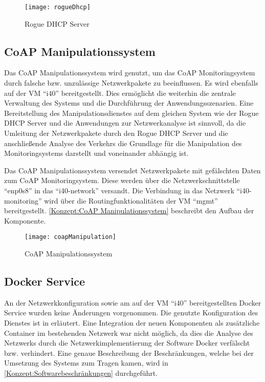 \begin{figure}[h]
  \centering
  \texttt{[image: rogueDhcp]}
  \caption{Rogue DHCP Server} 
  \label{Konzept:Rogue DHCP Server}
\end{figure}

\subsection{\ac{CoAP} Manipulationssystem}
Das \ac{CoAP} Manipulationssystem wird genutzt, um das \ac{CoAP} Monitoringsystem durch falsche bzw. unzulässige Netzwerkpakete zu beeinflussen. Es wird ebenfalls auf der \ac{VM} "`i40"' bereitgestellt. Dies ermöglicht die weiterhin die zentrale Verwaltung des Systems und die Durchführung der Anwendungsszenarien. Eine Bereitstellung des Manipulationsdienstes auf dem gleichen System wie der Rogue \ac{DHCP} Server und die Anwendungen zur Netzwerkanalyse ist sinnvoll, da die Umleitung der Netzwerkpakete durch den Rogue \ac{DHCP} Server und die anschließende Analyse des Verkehrs die Grundlage für die Manipulation des Monitoringsystems darstellt und voneinander abhängig ist.

Das \ac{CoAP} Manipulationssystem versendet Netzwerkpakete mit gefälschten Daten zum \ac{CoAP} Monitoringsystem. Diese werden über die Netzwerkschnittstelle "`enp0s8"' in das "`i40-network"' versandt. Die Verbindung in das Netzwerk "`i40-monitoring"' wird über die Routingfunktionalitäten der \ac{VM} "`mgmt"' bereitgestellt. \autoref{Konzept:CoAP Manipulationssystem} beschreibt den Aufbau der Komponente.

\begin{figure}[h]
  \centering
  \texttt{[image: coapManipulation]}
  \caption{CoAP Manipulationssystem} 
  \label{Konzept:CoAP Manipulationssystem}
\end{figure}

\subsection{Docker Service}
An der Netzwerkkonfiguration sowie am auf der \ac{VM} "`i40"' bereitgestellten Docker Service wurden keine Änderungen vorgenommen. Die genutzte Konfiguration des Dienstes ist in \cite{Weber2018} erläutert. Eine Integration der neuen Komponenten als zusätzliche Container im bestehenden Netzwerk war nicht möglich, da dies die Analyse des Netzwerks durch die Netzwerkimplementierung der Software Docker verfälscht bzw. verhindert. Eine genaue Beschreibung der Beschränkungen, welche bei der Umsetzung des Systems zum Tragen kamen, wird in \autoref{Konzept:Softwarebeschränkungen} durchgeführt.

